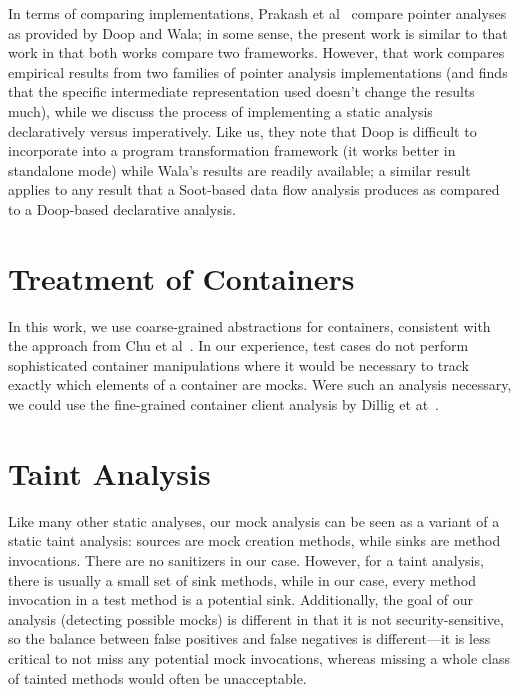 
In terms of comparing implementations, Prakash et al~\cite{prakash21:_effec_progr_repres_point_analy} compare pointer analyses as provided by Doop and Wala; in some sense, the present work is similar to that work in that both works compare two frameworks. However, that work compares empirical results from two families of pointer analysis implementations (and finds that the specific intermediate representation used doesn't change the results much), while we discuss the process of implementing a static analysis declaratively versus imperatively. Like us, they note that Doop is difficult to incorporate into a program transformation framework (it works better in standalone mode) while Wala's results are readily available; a similar result applies to any result that a Soot-based data flow analysis produces as compared to a Doop-based declarative analysis.

\section{Treatment of Containers}

In this work, we use coarse-grained abstractions for containers, consistent with the approach from Chu et al~\cite{chu12:_collec_disjoin_analy}. In our experience, test cases do not perform sophisticated container manipulations where it would be necessary to track exactly which elements of a container are mocks. Were such an analysis necessary, we could use the fine-grained container client analysis by Dillig et at~\cite{dillig11:_precis_reason_progr_using_contain}.

\section{Taint Analysis}

Like many other static analyses, our mock analysis can be seen as a variant of a static taint analysis: sources are mock creation methods, while sinks are method invocations. There are no sanitizers in our case. However, for a taint analysis, there is usually a small set of sink methods, while in our case, every method invocation in a test method is a potential sink. Additionally, the goal of our analysis (detecting possible mocks) is different in that it is not security-sensitive, so the balance between false positives and false negatives is different---it is less critical to not miss any potential mock invocations, whereas missing a whole class of tainted methods would often be unacceptable.
